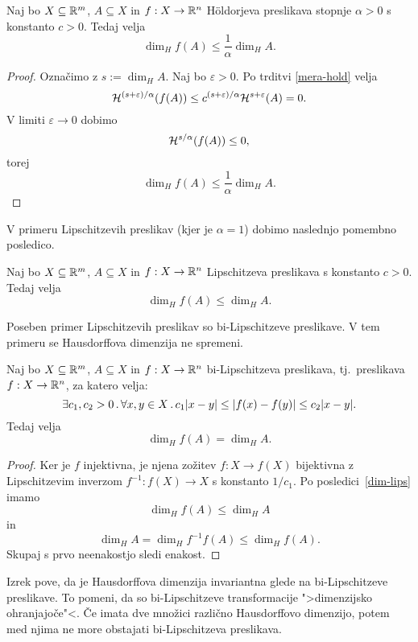 \begin{trditev}
    Naj bo \(X \subseteq \mathbb{R}^m\), \(A \subseteq X\) in \(f: X \to \mathbb{R}^n\) H\"oldorjeva preslikava stopnje \(\alpha > 0\) s konstanto \(c > 0\). Tedaj velja
    \[\dim_H f(A) \leq \frac{1}{\alpha} \dim_H A.\]
\end{trditev}

\begin{proof}
    Označimo z \(s:= \dim_H A\). Naj bo \(\varepsilon > 0\). Po trditvi \ref{mera-hold} velja
    \[\mathcal{H}^{(s +\varepsilon) / \alpha}(f(A)) \leq c^{(s +\varepsilon) / \alpha} \mathcal{H}^{s + \varepsilon}(A) = 0.\]
    V limiti \(\varepsilon \to 0\) dobimo
    \[\mathcal{H}^{s / \alpha}(f(A)) \leq 0,\]
    torej
    \[\dim_H f(A) \leq \frac{1}{\alpha} \dim_H A.\]
\end{proof}

V primeru Lipschitzevih preslikav (kjer je \(\alpha = 1\)) dobimo naslednjo pomembno posledico.

\begin{posledica}
    \label{dim-lips}
    Naj bo \(X \subseteq \mathbb{R}^m\), \(A \subseteq X\) in \(f: X \to \mathbb{R}^n\) Lipschitzeva preslikava s konstanto \(c > 0\). Tedaj velja
    \[\dim_H f(A) \leq \dim_H A.\]
\end{posledica}

\noindent Poseben primer Lipschitzevih preslikav so bi-Lipschitzeve preslikave. V tem primeru se Hausdorffova dimenzija ne spremeni.

\begin{izrek}
    Naj bo \(X \subseteq \mathbb{R}^m\), \(A \subseteq X\) in \(f: X \to \mathbb{R}^n\) bi-Lipschitzeva preslikava, tj.\ preslikava \(f: X \to \mathbb{R}^n\), za katero velja:
    \[\exists c_1, c_2 > 0 \,.\, \forall x, y \in X \,.\, c_1|x-y| \leq |f(x) - f(y)| \leq c_2|x-y|.\]
    Tedaj velja
    \[\dim_H f(A) = \dim_H A.\]
\end{izrek}

\begin{proof}
    Ker je \(f\) injektivna, je njena zožitev \(f: X \to f(X)\) bijektivna z Lipschitzevim inverzom \(f^{-1}: f(X) \to X\) s konstanto \(1 / c_1\). Po posledici~\ref{dim-lips} imamo
    \[\dim_H f(A) \leq \dim_H A\]
    in 
    \[\dim_H A = \dim_H f^{-1}f(A) \leq \dim_H f(A).\]
    Skupaj s prvo neenakostjo sledi enakost.
\end{proof}

\noindent Izrek pove, da je Hausdorffova dimenzija invariantna glede na bi-Lipschit\-zeve preslikave. To pomeni, da so bi-Lipschitzeve transformacije ">dimenzijsko ohranjajoče"<. Če imata dve množici različno Hausdorffovo dimenzijo, potem med njima ne more obstajati bi-Lipschitzeva preslikava.

